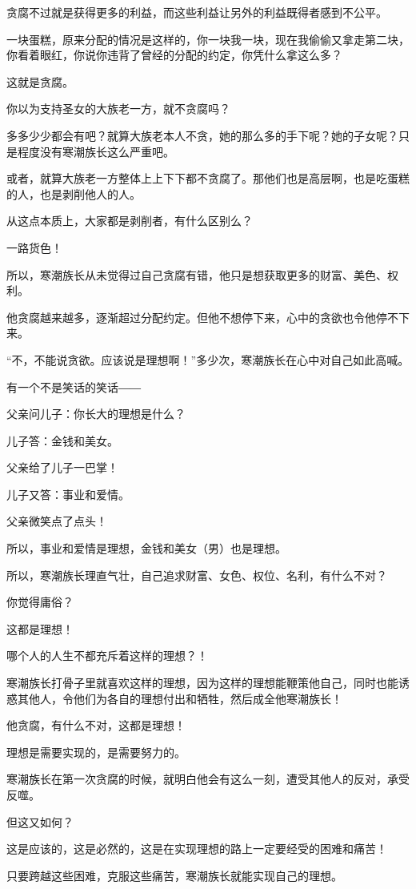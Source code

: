 \begin{this_body}
贪腐不过就是获得更多的利益，而这些利益让另外的利益既得者感到不公平。

一块蛋糕，原来分配的情况是这样的，你一块我一块，现在我偷偷又拿走第二块，你看着眼红，你说你违背了曾经的分配的约定，你凭什么拿这么多？

这就是贪腐。

你以为支持圣女的大族老一方，就不贪腐吗？

多多少少都会有吧？就算大族老本人不贪，她的那么多的手下呢？她的子女呢？只是程度没有寒潮族长这么严重吧。

或者，就算大族老一方整体上上下下都不贪腐了。那他们也是高层啊，也是吃蛋糕的人，也是剥削他人的人。

从这点本质上，大家都是剥削者，有什么区别么？

一路货色！

所以，寒潮族长从未觉得过自己贪腐有错，他只是想获取更多的财富、美色、权利。

他贪腐越来越多，逐渐超过分配约定。但他不想停下来，心中的贪欲也令他停不下来。

“不，不能说贪欲。应该说是理想啊！”多少次，寒潮族长在心中对自己如此高喊。

有一个不是笑话的笑话――

父亲问儿子：你长大的理想是什么？

儿子答：金钱和美女。

父亲给了儿子一巴掌！

儿子又答：事业和爱情。

父亲微笑点了点头！

所以，事业和爱情是理想，金钱和美女（男）也是理想。

所以，寒潮族长理直气壮，自己追求财富、女色、权位、名利，有什么不对？

你觉得庸俗？

这都是理想！

哪个人的人生不都充斥着这样的理想？！

寒潮族长打骨子里就喜欢这样的理想，因为这样的理想能鞭策他自己，同时也能诱惑其他人，令他们为各自的理想付出和牺牲，然后成全他寒潮族长！

他贪腐，有什么不对，这都是理想！

理想是需要实现的，是需要努力的。

寒潮族长在第一次贪腐的时候，就明白他会有这么一刻，遭受其他人的反对，承受反噬。

但这又如何？

这是应该的，这是必然的，这是在实现理想的路上一定要经受的困难和痛苦！

只要跨越这些困难，克服这些痛苦，寒潮族长就能实现自己的理想。


\end{this_body}
